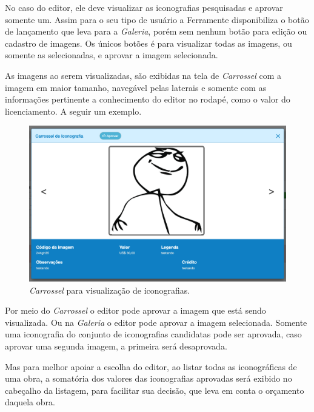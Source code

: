 \documentclass[
  12pt,				%
  openany,
  oneside,
  a4paper,			%
  english,			%
  brazil
]{article}
\numberwithin{figure}{section}
\numberwithin{table}{section}
\begin{document}
No caso do editor, ele deve visualizar as iconografias pesquisadas e aprovar somente um. Assim para o seu tipo de usuário a Ferramente disponibiliza o botão de lançamento que leva para a \textit{Galeria}, porém sem nenhum botão para edição ou cadastro de imagens. Os únicos botões é para visualizar todas as imagens, ou somente as selecionadas, e aprovar a imagem selecionada.

As imagens ao serem visualizadas, são exibidas na tela de \textit{Carrossel} com a imagem em maior tamanho, navegável pelas laterais e somente com as informações pertinente a conhecimento do editor no rodapé, como o valor do licenciamento. A seguir um exemplo.

\begin{figure}[H]
	\centering
	\includegraphics[width=0.9\linewidth]{iconr_carrossel}
	\caption{\textit{Carrossel} para visualização de iconografias.}
	\label{fig:iconr:carrossel}
\end{figure}

Por meio do \textit{Carrossel} o editor pode aprovar a imagem que está sendo visualizada. Ou na \textit{Galeria} o editor pode aprovar a imagem selecionada. Somente uma iconografia do conjunto de iconografias candidatas pode ser aprovada, caso aprovar uma segunda imagem, a primeira será desaprovada.

Mas para melhor apoiar a escolha do editor, ao listar todas as iconográficas de uma obra, a somatória dos valores das iconografias aprovadas será exibido no cabeçalho da listagem, para facilitar sua decisão, que leva em conta o orçamento daquela obra.
 
\end{document}
